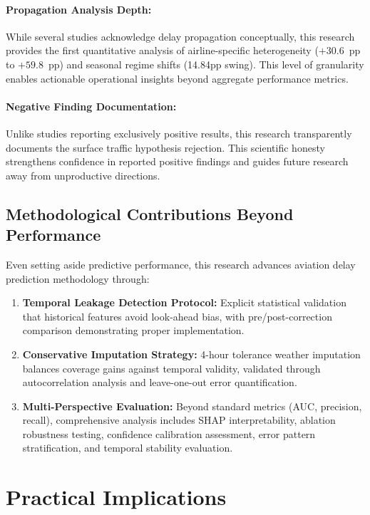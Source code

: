 \documentclass{report}
\begin{document}
\paragraph{Propagation Analysis Depth:} While several studies acknowledge delay propagation conceptually, this research provides the first quantitative analysis of airline-specific heterogeneity ($+30.6$~pp to $+59.8$~pp) and seasonal regime shifts (14.84pp swing). This level of granularity enables actionable operational insights beyond aggregate performance metrics.

\paragraph{Negative Finding Documentation:} Unlike studies reporting exclusively positive results, this research transparently documents the surface traffic hypothesis rejection. This scientific honesty strengthens confidence in reported positive findings and guides future research away from unproductive directions.

\subsection{Methodological Contributions Beyond Performance}

Even setting aside predictive performance, this research advances aviation delay prediction methodology through:

\begin{enumerate}
    \item \textbf{Temporal Leakage Detection Protocol:} Explicit statistical validation that historical features avoid look-ahead bias, with pre/post-correction comparison demonstrating proper implementation.
    
    \item \textbf{Conservative Imputation Strategy:} 4-hour tolerance weather imputation balances coverage gains against temporal validity, validated through autocorrelation analysis and leave-one-out error quantification.
    
    \item \textbf{Multi-Perspective Evaluation:} Beyond standard metrics (AUC, precision, recall), comprehensive analysis includes SHAP interpretability, ablation robustness testing, confidence calibration assessment, error pattern stratification, and temporal stability evaluation.
\end{enumerate}

\section{Practical Implications}
\label{sec:practical_implications}
\end{document}
